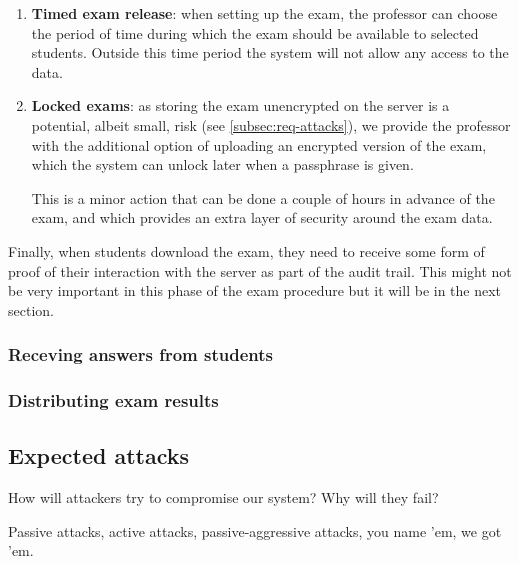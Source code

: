 \documentclass{article}
\begin{document}
\begin{enumerate}

\item \textbf{Timed exam release}: when setting up the exam, the professor can
choose the period of time during which the exam should be available to selected
students. Outside this time period the system will not allow any access to the
data.

\item \textbf{Locked exams}: as storing the exam unencrypted on the server is a
potential, albeit small, risk (see \autoref{subsec:req-attacks}), we provide the
professor with the additional option of uploading an encrypted version of the
exam, which the system can unlock later when a passphrase is given.

This is a minor action that can be done a couple of hours in advance of the
exam, and which provides an extra layer of security around the exam data.

\end{enumerate}

Finally, when students download the exam, they need to receive some form of
proof of their interaction with the server as part of the audit trail. This
might not be very important in this phase of the exam procedure but it will be
in the next section.

\subsubsection{Receving answers from students}


\subsubsection{Distributing exam results}


\subsection{Expected attacks}
\label{subsec:req-attacks}

How will attackers try to compromise our system? Why will they fail?

Passive attacks, active attacks, passive-aggressive attacks, you name 'em, we
got 'em.
\end{document}
